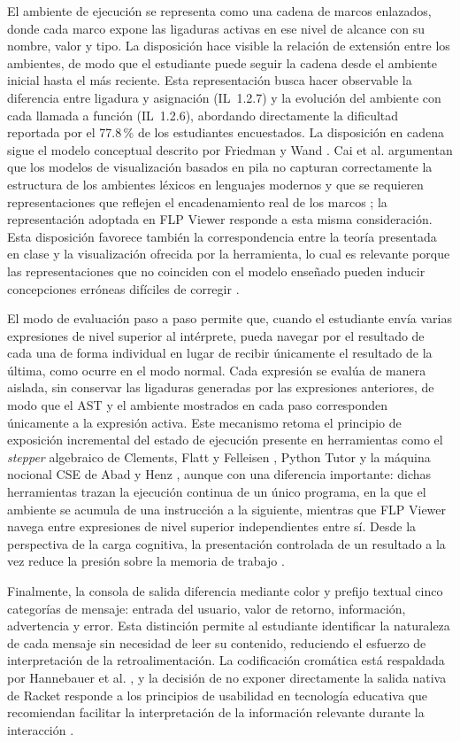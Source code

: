 El ambiente de ejecución se representa como una cadena de marcos enlazados, donde cada marco expone las ligaduras activas en ese nivel de alcance con su nombre, valor y tipo. La disposición hace visible la relación de extensión entre los ambientes, de modo que el estudiante puede seguir la cadena desde el ambiente inicial hasta el más reciente. Esta representación busca hacer observable la diferencia entre ligadura y asignación (IL~1.2.7) y la evolución del ambiente con cada llamada a función (IL~1.2.6), abordando directamente la dificultad reportada por el 77.8\,\% de los estudiantes encuestados. La disposición en cadena sigue el modelo conceptual descrito por Friedman y Wand \cite{Friedman2008EPL}. 
Cai et al. argumentan que los modelos de visualización basados en pila no capturan correctamente la estructura de los ambientes léxicos en lenguajes modernos y que se requieren representaciones que reflejen el encadenamiento real de los marcos \cite{Cai2023VisualizingEnvironments}; la representación adoptada en FLP Viewer responde a esta misma consideración. Esta disposición favorece también la correspondencia entre la teoría presentada en clase y la visualización ofrecida por la herramienta, lo cual es relevante porque las representaciones que no coinciden con el modelo enseñado pueden inducir concepciones erróneas difíciles de corregir \cite{Guo2013}.

El modo de evaluación paso a paso permite que, cuando el estudiante envía varias expresiones de nivel superior al intérprete, pueda navegar por el resultado de cada una de forma individual en lugar de recibir únicamente el resultado de la última, como ocurre en el modo normal. Cada expresión se evalúa de manera aislada, sin conservar las ligaduras generadas por las expresiones anteriores, de modo que el AST y el ambiente mostrados en cada paso corresponden únicamente a la expresión activa. Este mecanismo retoma el principio de exposición incremental del estado de ejecución presente en herramientas como el \textit{stepper} algebraico de Clements, Flatt y Felleisen \cite{Clements2001}, Python Tutor \cite{Guo2013} y la máquina nocional CSE de Abad y Henz \cite{Abad2024BeyondSICP}, aunque con una diferencia importante: dichas herramientas trazan la ejecución continua de un único programa, en la que el ambiente se acumula de una instrucción a la siguiente, mientras que FLP Viewer navega entre expresiones de nivel superior independientes entre sí. Desde la perspectiva de la carga cognitiva, la presentación controlada de un resultado a la vez reduce la presión sobre la memoria de trabajo \cite{sweller2024cognitive}.

Finalmente, la consola de salida diferencia mediante color y prefijo textual cinco categorías de mensaje: entrada del usuario, valor de retorno, información, advertencia y error. Esta distinción permite al estudiante identificar la naturaleza de cada mensaje sin necesidad de leer su contenido, reduciendo el esfuerzo de interpretación de la retroalimentación. La codificación cromática está respaldada por Hannebauer et al. \cite{Hannebauer2018}, y la decisión de no exponer directamente la salida nativa de Racket responde a los principios de usabilidad en tecnología educativa que recomiendan facilitar la interpretación de la información relevante durante la interacción \cite{lu2022usability}.
